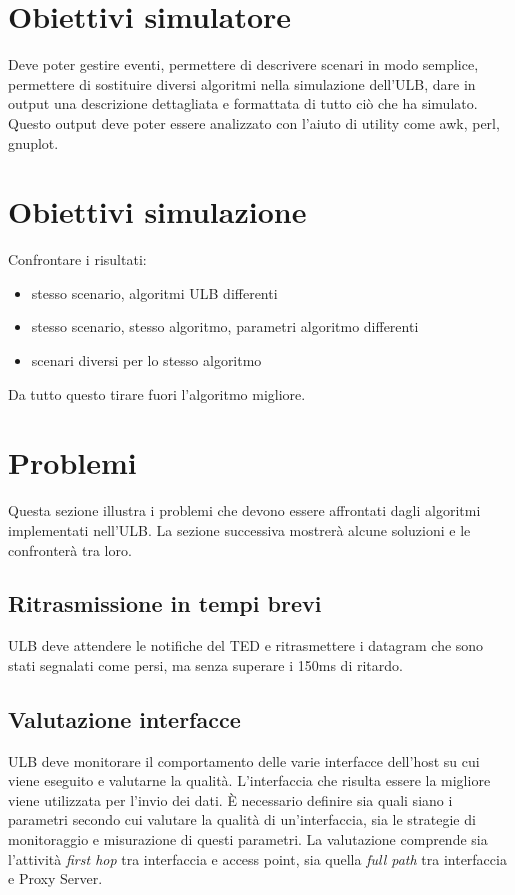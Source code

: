 \documentclass[12pt,a4paper,openright,twoside]{book}
\begin{document}
\section{Obiettivi simulatore}
Deve poter gestire eventi, permettere di descrivere scenari in modo
semplice, permettere di sostituire diversi algoritmi nella simulazione
dell'ULB, dare in output una descrizione dettagliata e formattata di
tutto ciò che ha simulato. Questo output deve poter essere analizzato
con l'aiuto di utility come awk, perl, gnuplot.

\section{Obiettivi simulazione}
Confrontare i risultati:

\begin{itemize}
\item stesso scenario, algoritmi ULB differenti
\item stesso scenario, stesso algoritmo, parametri algoritmo differenti
\item scenari diversi per lo stesso algoritmo
\end{itemize}

Da tutto questo tirare fuori l'algoritmo migliore.

\section{Problemi}
Questa sezione illustra i problemi che devono essere affrontati dagli
algoritmi implementati nell'ULB. La sezione successiva mostrerà alcune
soluzioni e le confronterà tra loro.

\subsection{Ritrasmissione in tempi brevi}
ULB deve attendere le notifiche del TED e ritrasmettere i datagram che
sono stati segnalati come persi, ma senza superare i 150ms di ritardo.

\subsection{Valutazione interfacce}
ULB deve monitorare il comportamento delle varie interfacce dell'host
su cui viene eseguito e valutarne la qualità. L'interfaccia che
risulta essere la migliore viene utilizzata per l'invio dei dati. È
necessario definire sia quali siano i parametri secondo cui valutare
la qualità di un'interfaccia, sia le strategie di monitoraggio e
misurazione di questi parametri. La valutazione comprende sia
l'attività \emph{first hop} tra interfaccia e access point, sia quella
\emph{full path} tra interfaccia e Proxy Server.
\end{document}
